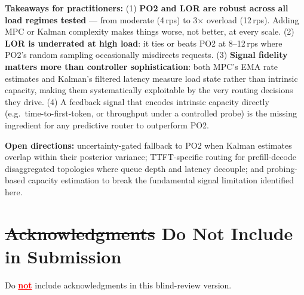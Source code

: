 \documentclass[blind]{gtac}
\begin{document}
\textbf{Takeaways for practitioners:}
(1) \textbf{PO2 and LOR are robust across all load regimes tested} ---
from moderate (4\,rps) to 3$\times$ overload (12\,rps). Adding MPC or
Kalman complexity makes things worse, not better, at every scale.
(2) \textbf{LOR is underrated at high load}: it ties or beats PO2 at
8--12\,rps where PO2's random sampling occasionally misdirects requests.
(3) \textbf{Signal fidelity matters more than controller sophistication}:
both MPC's EMA rate estimates and Kalman's filtered latency measure
load state rather than intrinsic capacity, making them systematically
exploitable by the very routing decisions they drive.
(4) A feedback signal that encodes intrinsic capacity directly
(e.g.\ time-to-first-token, or throughput under a controlled probe)
is the missing ingredient for any predictive router to outperform PO2.

\textbf{Open directions:} uncertainty-gated fallback to PO2 when
Kalman estimates overlap within their posterior variance; TTFT-specific
routing for prefill-decode disaggregated topologies where queue depth
and latency decouple; and probing-based capacity estimation to break
the fundamental signal limitation identified here.

\section*{\st{Acknowledgments} Do Not Include in Submission}
Do \textcolor{red}{\ul{\textbf{not}}} include acknowledgments in this blind-review version.

\begingroup
\let\itshape\upshape


\endgroup
\end{document}
